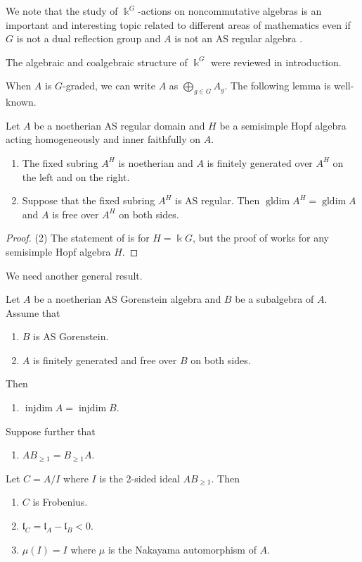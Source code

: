 We note that the study of $\Bbbk^G$-actions on noncommutative 
algebras is an important and interesting topic related to different 
areas of mathematics even if $G$ is not a dual reflection group and $A$ 
is not an AS regular algebra \cite{CM}. 

The algebraic and coalgebraic structure of $\Bbbk^G$ were reviewed
in introduction. 

When $A$ is $G$-graded, we can write 
$A$ as $\bigoplus_{g\in G} A_g$.
The following lemma  is well-known.

\begin{lemma}
\label{xxlem3.3} Let $A$ be a noetherian AS regular domain and 
$H$ be a semisimple Hopf algebra acting homogeneously and inner 
faithfully on $A$.
\begin{enumerate}
\item[(1)]\cite[Lemma 2.4]{KKZ3}
The fixed subring $A^H$ is noetherian and $A$ is finitely generated 
over $A^H$ on the left and on the right.
\item[(2)]
Suppose that the fixed subring $A^H$ is AS regular.
Then $\operatorname{gldim} A^H=\operatorname{gldim} A$ and $A$ is free over $A^H$ on both sides.
\end{enumerate}
\end{lemma}

\begin{proof} (2) The statement of \cite[Lemma 1.10(d)]{KKZ1} is
for $H=\Bbbk G$, but the proof of \cite[Lemma 1.10(d)]{KKZ1} works for 
any semisimple Hopf algebra $H$.
\end{proof}

We need another general result.

\begin{lemma}
\label{xxlem3.4} 
Let $A$ be a noetherian AS Gorenstein algebra and $B$ be a 
subalgebra of $A$. Assume that
\begin{enumerate}
\item[(i)]
$B$ is AS Gorenstein.
\item[(ii)]
$A$ is finitely generated and free over $B$ on both sides.
\end{enumerate}
Then 
\begin{enumerate}
\item[(1)]
$\operatorname{injdim} A=\operatorname{injdim} B$.
\end{enumerate}
Suppose further that
\begin{enumerate}
\item[(iii)]
$AB_{\geq 1}=B_{\geq 1} A$.
\end{enumerate}
Let $C=A/I$ where $I$ is the 2-sided ideal $AB_{\geq 1}$. 
Then 
\begin{enumerate}
\item[(2)]
$C$ is Frobenius. 
\item[(3)]
${\mathfrak l}_C={\mathfrak l}_A-{\mathfrak l}_B<0$.
\item[(4)]
$\mu(I)=I$ where $\mu$ is the Nakayama automorphism of
$A$.
\end{enumerate}
\end{lemma}

